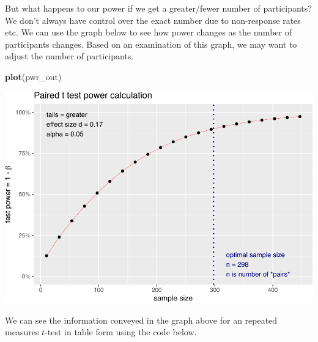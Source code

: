 \documentclass[
]{krantz}
\makeatletter
\newenvironment{Shaded}{\begin{snugshade}}{\end{snugshade}}
\newcommand{\KeywordTok}[1]{\textcolor[rgb]{0.27,0.27,0.27}{\textbf{#1}}}
\newcommand{\NormalTok}[1]{#1}
\newenvironment{kframe}{%
\medskip{}
\setlength{\fboxsep}{.8em}
 \def\at@end@of@kframe{}%
 \ifinner\ifhmode%
  \def\at@end@of@kframe{\end{minipage}}%
  \begin{minipage}{\columnwidth}%
 \fi\fi%
 \def\FrameCommand##1{\hskip\@totalleftmargin \hskip-\fboxsep
 \colorbox{shadecolor}{##1}\hskip-\fboxsep
     \hskip-\linewidth \hskip-\@totalleftmargin \hskip\columnwidth}%
 \MakeFramed {\advance\hsize-\width
   \@totalleftmargin\z@ \linewidth\hsize
   \@setminipage}}%
 {\par\unskip\endMakeFramed%
 \at@end@of@kframe}
\renewenvironment{Shaded}{\begin{kframe}}{\end{kframe}}
\makeatother
\begin{document}
But what happens to our power if we get a greater/fewer number of participants? We don't always have control over the exact number due to non-response rates etc. We can use the graph below to see how power changes as the number of participants changes. Based on an examination of this graph, we may want to adjust the number of participants.

\begin{Shaded}
\begin{Highlighting}[]
\KeywordTok{plot}\NormalTok{(pwr_out)}
\end{Highlighting}
\end{Shaded}

\includegraphics{bookdown_files/figure-latex/unnamed-chunk-248-1.pdf}

We can see the information conveyed in the graph above for an repeated measures \(t\)-test in table form using the code below.
\end{document}
